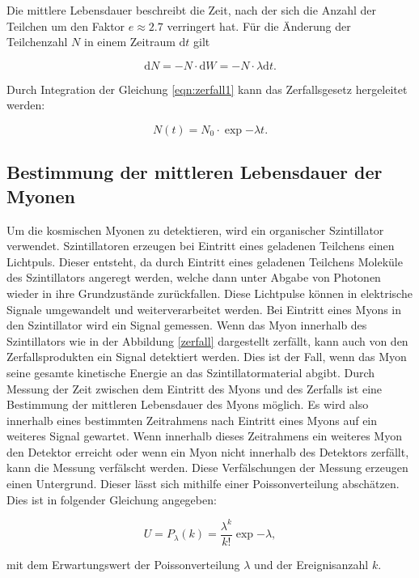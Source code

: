 Die mittlere Lebensdauer beschreibt die Zeit, nach der sich die Anzahl der Teilchen um
den Faktor $e \approx 2.7$ verringert hat.
Für die Änderung der Teilchenzahl $N$ in einem Zeitraum $\text{d}t$ gilt

\begin{equation}
  \text{d}N = - N \cdot \text{d}W = - N \cdot \lambda \text{d}t.
  \label{eqn:zerfall1}
\end{equation}

Durch Integration der Gleichung \ref{eqn:zerfall1} kann das Zerfallsgesetz hergeleitet werden:

\begin{equation}
  N(t) = N_{0} \cdot \exp{- \lambda t}.
  \label{eqn:zerfallsgesetz}
\end{equation}

\subsection{Bestimmung der mittleren Lebensdauer der Myonen}
\label{subsec:BestimmungLebensdauer}

Um die kosmischen Myonen zu detektieren, wird ein organischer Szintillator verwendet.
Szintillatoren erzeugen bei Eintritt eines geladenen Teilchens einen Lichtpuls.
Dieser entsteht, da durch Eintritt eines geladenen Teilchens Moleküle des Szintillators
angeregt werden, welche dann unter Abgabe von Photonen wieder in ihre Grundzustände zurückfallen.
Diese Lichtpulse können in elektrische Signale umgewandelt und weiterverarbeitet werden.
Bei Eintritt eines Myons in den Szintillator wird ein Signal gemessen. Wenn das Myon innerhalb
des Szintillators wie in der Abbildung \ref{zerfall} dargestellt zerfällt, kann auch von den Zerfallsprodukten
ein Signal detektiert werden. Dies ist der Fall, wenn das Myon seine gesamte kinetische Energie
an das Szintillatormaterial abgibt.
Durch Messung der Zeit zwischen dem Eintritt des Myons und des
Zerfalls ist eine Bestimmung der mittleren Lebensdauer des Myons möglich. Es wird also
innerhalb eines bestimmten Zeitrahmens nach Eintritt eines Myons auf ein weiteres Signal
gewartet. Wenn innerhalb dieses Zeitrahmens ein weiteres Myon den Detektor erreicht oder wenn
ein Myon nicht innerhalb des Detektors zerfällt, kann die Messung verfälscht werden.
Diese Verfälschungen der Messung erzeugen einen Untergrund. Dieser lässt sich mithilfe
einer Poissonverteilung abschätzen. Dies ist in folgender Gleichung angegeben:

\begin{equation}
  U = P_{\lambda} (k) = \frac{\lambda^{k}}{k!} \exp{-\lambda},
  \label{eqn:Untergrundrate}
\end{equation}

mit dem Erwartungswert der Poissonverteilung $\lambda$ und der Ereignisanzahl $k$.
